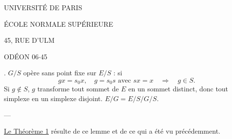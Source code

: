 \begin{center}
UNIVERSITÉ DE PARIS


ÉCOLE NORMALE SUPÉRIEURE


45, RUE D'ULM

ODÉON 06$\cdot$45

\end{center}

. $G/S$ opère sans point fixe sur $E/S$ : si
\[
gx=s_0x,\quad g=s_0s\text{ avec }sx=x\quad\Rightarrow\quad g\in S.
\]
Si $g\notin S$, $g$ transforme tout sommet de $E$ en un sommet distinct, donc tout simplexe en un simplexe disjoint. $E/G=E/S\big/G/S$.

---

\uline{Le Théorème 1}  résulte de ce lemme et de ce qui a été vu précédemment.



